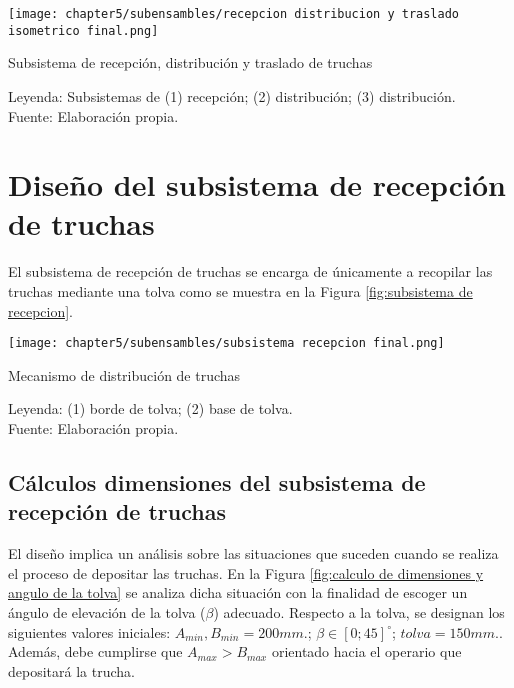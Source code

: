 \begin{myfigure}[H]
	\footnotesize\centering
	\texttt{[image: chapter5/subensambles/recepcion distribucion y traslado isometrico final.png]}
	\caption{Subsistema de recepción, distribución y traslado de truchas}
	\begin{myflushcenter}
		Leyenda: Subsistemas de (1) recepción; (2) distribución; (3) distribución.\\
		Fuente: Elaboración propia.
	\end{myflushcenter}
	\label{fig:subsistema de recepción, distribución y traslado de truchas}
\end{myfigure}

\vspace{-2.0em}

\section{Diseño del subsistema de recepción de truchas}

El subsistema de recepción de truchas se encarga de únicamente a recopilar las truchas mediante una tolva como se muestra en la Figura \ref{fig:subsistema de recepcion}.

\begin{myfigure}[H]
	\footnotesize\centering
	\texttt{[image: chapter5/subensambles/subsistema recepcion final.png]}
	\caption{Mecanismo de distribución de truchas}
	\begin{myflushcenter}
		Leyenda: (1) borde de tolva; (2) base de tolva. \\
		Fuente: Elaboración propia.
	\end{myflushcenter}
	\label{fig:subsistema de recepcion}
\end{myfigure}
\vspace{-2.0em}

\subsection{Cálculos dimensiones del subsistema de recepción de truchas}

El diseño implica un análisis sobre las situaciones que suceden cuando se realiza el proceso de depositar las truchas. En la Figura \ref{fig:calculo de dimensiones y angulo de la tolva} se analiza dicha situación con la finalidad de escoger un ángulo de elevación de la tolva ($\beta$) adecuado. Respecto a la tolva, se designan los siguientes valores iniciales: $A_{min},B_{min}=200 mm.$; $\beta \in [0;45] ^\circ$; ${tolva}=150 mm.$. Además, debe cumplirse que $A_{max}>B_{max}$ orientado hacia el operario que depositará la trucha.

